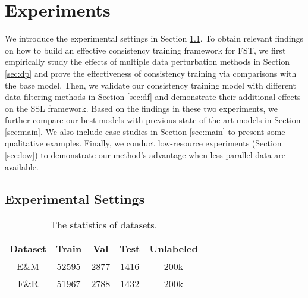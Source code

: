 \section{Experiments}
We introduce the experimental settings in Section \ref{sec:setup}. To obtain relevant findings on how to build an effective consistency training framework for FST, we first empirically study the effects of multiple data perturbation methods in Section \ref{sec:dp} and prove the effectiveness of consistency training via comparisons with the base model. Then, we validate our consistency training model with different data filtering methods in Section \ref{sec:df} and demonstrate their additional effects on the SSL framework. Based on the findings in these two experiments, we further compare our best models with previous state-of-the-art models in Section \ref{sec:main}. We also include case studies in Section \ref{sec:main} to present some qualitative examples. Finally, we conduct low-resource experiments (Section \ref{sec:low}) to demonstrate our method's advantage when less parallel data are available. 


\subsection{Experimental Settings}
\label{sec:setup}

\begin{table}[t]
    \centering
    \small
    \begin{tabular}{|c|c|c|c|c|}
    \hline
     Dataset    & Train & Val & Test & Unlabeled \\
     \hline
    E\&M      &  52595& 2877& 1416 & 200k\\
    \hline
    F\&R  &51967 &2788& 1432 & 200k\\
    \hline
    \end{tabular}
    \caption{The statistics of datasets.}
    \label{tab:dataset}
\end{table}

